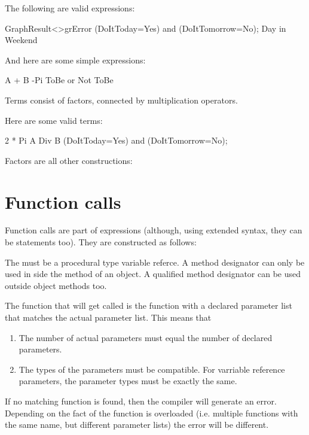 \documentclass{report}
\begin{document}


The following are valid expressions:
\begin{listing}
GraphResult<>grError
(DoItToday=Yes) and (DoItTomorrow=No);   
Day in Weekend
\end{listing}
And here are some simple expressions:
\begin{listing}
A + B
-Pi
ToBe or Not ToBe
\end{listing}

Terms consist of factors, connected by multiplication operators.



Here are some valid terms:
\begin{listing}
2 * Pi
A Div B
(DoItToday=Yes) and (DoItTomorrow=No);   
\end{listing}

Factors are all other constructions:



\section{Function calls}

Function calls are part of expressions (although, using extended syntax,
they can be statements too). They are constructed as follows:



The  must be a procedural type variable referce.
A method designator can only be used in side the method of an object. A
qualified method designator can be used outside object methods too.

The function that will get called is the function with a declared parameter
list that matches the actual parameter list. This means that
\begin{enumerate}
\item The number of actual parameters must equal the number of declared
parameters.
\item The types of the parameters must be compatible. For varriable
reference parameters, the parameter types must be exactly the same. 
\end{enumerate}

If no matching function is found, then the compiler will generate an error.
Depending on the fact of the function is overloaded (i.e. multiple functions
with the same name, but different parameter lists) the error will be
different.
\end{document}
